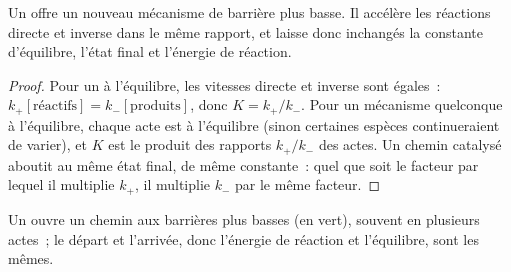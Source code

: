 \begin{proposition}\label{prop:b1:elementary-steps:catalysis}
Un  offre un nouveau mécanisme de barrière plus basse. Il
accélère les réactions directe et inverse dans le même rapport, et
laisse donc inchangés la constante d'équilibre, l'état final et
l'énergie de réaction.
\end{proposition}

\begin{proof}
Pour un  à l'équilibre, les vitesses directe et inverse
sont égales~: $k_+[\text{réactifs}] = k_-[\text{produits}]$, donc
$K = k_+/k_-$. Pour un mécanisme quelconque à l'équilibre, chaque acte
est à l'équilibre (sinon certaines espèces continueraient de varier), et
$K$ est le produit des rapports
$k_+/k_-$ des actes. Un chemin catalysé aboutit au même état final, de
même constante~: quel que soit le facteur par lequel il multiplie $k_+$,
il multiplie $k_-$
par le même facteur.
\end{proof}

\begin{omfigure}

{\small Un  ouvre un chemin aux barrières plus basses (en
vert), souvent en plusieurs actes~; le départ et l'arrivée, donc
l'énergie de réaction et l'équilibre, sont les mêmes.}
\end{omfigure}


